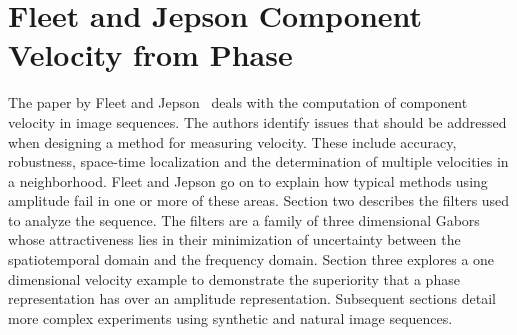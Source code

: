 \documentclass[letterpaper]{article}
\date{\today}
\begin{document}
\maketitle
\section{Fleet and Jepson Component Velocity from Phase}
The paper by Fleet and Jepson~\cite{phase-opt-flow} deals with the
computation of component velocity in image sequences.  The authors
identify issues that should be addressed when designing a method for
measuring velocity.  These include accuracy, robustness, space-time
localization and the determination of multiple velocities in a
neighborhood.  Fleet and Jepson go on to explain how typical methods
using amplitude fail in one or more of these areas.  Section two
describes the filters used to analyze the sequence.  The filters are a
family of three dimensional Gabors whose attractiveness lies in their
minimization of uncertainty between the spatiotemporal domain and the
frequency domain.  Section three explores a one dimensional velocity
example to demonstrate the superiority that a phase representation has
over an amplitude representation.  Subsequent sections detail more
complex experiments using synthetic and natural image sequences.



\end{document}

